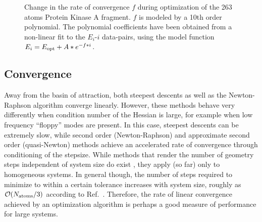 \documentclass[prl,aps,preprint,superbib,12pt]{revtex4}
\begin{document}
{\begin{figure}[h]
\caption{
Change in the rate of convergence $f$ during  optimization
of the 263 atoms Protein Kinase A fragment. $f$ is modeled
by a 10th order polynomial. The polynomial coefficients
have been obtained from a non-linear fit to the $E_{i}$-$i$
data-pairs, using the model function $E_{i}=E_{\rm opt}+A*e^{-f*i}$.}
\label{convfact} 
\end{figure}
}

\subsection{Convergence}

Away from the basin of attraction, both steepest descents as well as the 
Newton-Raphson algorithm converge linearly.   However, these methods behave very differently
when condition number of the Hessian is large, for example when low frequency ``floppy'' modes
are present.  In this case, steepest descents can be extremely slow, while second order 
(Newton-Raphson) and approximate second order (quasi-Newton) methods achieve an accelerated rate 
of convergence through conditioning of the stepsize.   While methods that render  the
number of geometry steps independent of system size do exist \cite{SGoedecker01}, they apply (so far) 
only to homogeneous systems.  In general though, the number of steps required to minimize to within
a certain tolerance increases with system size, roughly as ${\cal O}(N_{\rm atoms}/3)$ 
according to Ref.~.  Therefore, the rate of linear convergence achieved by an 
optimization algorithm is perhaps a good  measure of performance for large systems.  
\end{document}
